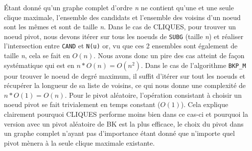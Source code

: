 \documentclass[12pt,a4paper]{article}
\begin{document}
Étant donné qu'un graphe complet d'ordre \emph{n} ne contient qu'une et une seule clique maximale, l'ensemble des candidats et l'ensemble des voisins d'un noeud sont les mêmes et sont de taille \emph{n}.
Dans le cas de CLIQUES, pour trouver un noeud pivot, nous devons itérer sur tous les noeuds de \texttt{SUBG} (taille \emph{n}) et réaliser l'intersection entre \texttt{CAND} et \texttt{N(u)} or, vu que ces 2 ensembles sont également de taille \emph{n}, cela se fait en \(O(n)\). Nous avons donc un pire des cas atteint de façon systématique qui est en \(n * O(n) = O(n^2)\).
Dans le cas de l'algorithme \texttt{BKP\_M} pour trouver le noeud de degré maximum, il suffit d'itérer sur tout les noeuds et récupérer la longueur de sa liste de voisins, ce qui nous donne une complexité de \(n * O(1) = O(n)\).
Pour le pivot aléatoire, l'opération consistant à choisir un noeud pivot se fait trivialement en temps constant (\(O(1)\)).
Cela explique clairement pourquoi CLIQUES performe moins bien dans ce cas-ci et pourquoi la version avec un pivot aléatoire de BK est la plus efficace, le choix du pivot dans un graphe complet n'ayant pas d'importance étant donné que n'importe quel pivot mènera à la seule clique maximale existante.
\end{document}
